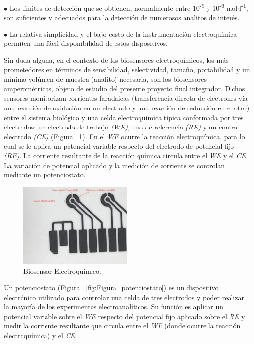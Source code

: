 $\bullet$ Los límites de detección que se obtienen, normalmente entre 10\textsuperscript{-9} y 10\textsuperscript{-6} mol$\cdot$l\textsuperscript{-1}, son suficientes y adecuados para la detección de numerosos analitos de interés.

$\bullet$ La relativa simplicidad y el bajo costo de la instrumentación electroquímica permiten una fácil disponibilidad de estos dispositivos.


Sin duda alguna, en el contexto de los biosensores electroquímicos, los más prometedores en términos de sensibilidad, selectividad, tamaño, portabilidad y un mínimo volúmen de muestra (analito) necesaria, son los biosensores amperométricos, objeto de estudio del presente proyecto final integrador. Dichos sensores monitorizan corrientes faradaicas (transferencia directa de electrones vía una reacción de oxidación en un electrodo y una reacción de reducción en el otro) entre el sistema biológico y una celda electroquímica típica conformada por tres electrodos: un electrodo de trabajo \emph{(WE)}, uno de referencia \emph{(RE)} y un contra electrodo \emph{(CE)} (Figura ~\ref{fig:Figura_Definicion_Electrodo}). En el \emph{WE} ocurre la reacción electroquímica, para lo cual se le aplica un potencial variable respecto del electrodo de potencial fijo \emph{(RE)}. La corriente resultante de la reacción química circula entre el \emph{WE} y el \emph{CE}. La variación de potencial aplicado y la medición de corriente se controlan mediante un potenciostato.

\begin{figure}[H]
  \centering
    \includegraphics[width=0.5\textwidth]{Figuras/Figura_Definicion_Electrodo}
  \caption{Biosensor Electroquímico.}
  \label{fig:Figura_Definicion_Electrodo}
\end{figure}

Un potenciostato (Figura ~\ref{fig:Figura_potenciostato}) es un dispositivo electrónico utilizado para controlar una celda de tres electrodos y poder realizar la mayoría de los experimentos electroanalíticos. Su función es aplicar un potencial variable sobre el \emph{WE} respecto del potencial fijo aplicado sobre el \emph{RE} y medir la corriente resultante que circula entre el \emph{WE} (donde ocurre la reacción electroquímica) y el \emph{CE}.

